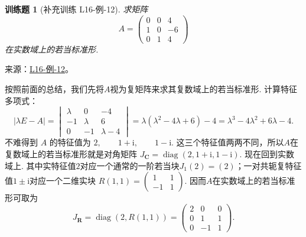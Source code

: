 \documentclass[UTF8,12pt,a4paper,fontset=fandol]{ctexart}
\newtheorem{exercise}{训练题}[section]
\begin{document}
\begin{exercise}[补充训练 L16-例-12]\label{prob:L16-例-12}
求矩阵
    \[
        A=\begin{pmatrix}
            0 & 0 & 4 \\
            1 & 0 & -6 \\
            0 & 1 & 4
        \end{pmatrix}
    \]
    在实数域上的若当标准形.
\end{exercise}
\noindent 来源：\href{https://github.com/yhwu-is/Linear-Algebra-Left-Undone/blob/new/%E8%AE%B2%E4%B9%89/%E4%B8%93%E9%A2%98/16%20%E8%8B%A5%E5%BD%93%E6%A0%87%E5%87%86%E5%BD%A2.tex}{L16-例-12}。
\begin{solve}
按照前面的总结，我们先将$A$视为复矩阵来求其复数域上的若当标准形. 计算特征多项式：
    \[
        |\lambda E-A|
        =\begin{vmatrix}
            \lambda & 0 & -4 \\
            -1 & \lambda & 6 \\
            0 & -1 & \lambda-4
        \end{vmatrix}
        =\lambda(\lambda^2-4\lambda+6)-4
        =\lambda^3-4\lambda^2+6\lambda-4.
    \]
    不难得到 $A$ 的特征值为 $2,\qquad 1+\mathrm{i},\qquad 1-\mathrm{i}$. 这三个特征值两两不同，所以$A$在复数域上的若当标准形就是对角矩阵 $J_{\mathbf{C}}=\operatorname{diag}(2,1+\mathrm{i},1-\mathrm{i})$. 现在回到实数域上. 其中实特征值$2$对应一个通常的一阶若当块$J_1(2)=(2)$；一对共轭复特征值$1\pm\mathrm{i}$对应一个二维实块 $R(1,1)=\begin{pmatrix}
            1 & 1 \\
            -1 & 1
        \end{pmatrix}$. 因而$A$在实数域上的若当标准形可取为
    \[
        J_{\mathbf{R}}=\operatorname{diag}(2,R(1,1))
        =\begin{pmatrix}
            2 & 0 & 0 \\
            0 & 1 & 1 \\
            0 & -1 & 1
        \end{pmatrix}.
    \]
\end{solve}
\end{document}

